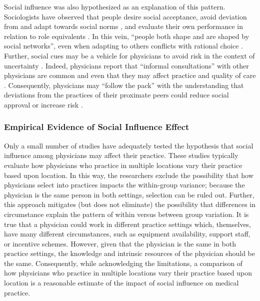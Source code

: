 \documentclass[12pt]{article}
\begin{document}
Social influence was also hypothesized as an explanation of this pattern. Sociologists have observed that people desire social acceptance, avoid deviation from and adapt towards social norms \citep{eddyVariationsPhysicianPractice1984,dambrunImpactHierarchyenhancingVs2002}, and evaluate their own performance in relation to role equivalents \citep{fehrFriendshipProcesses1996,ericksonRelationalBasisAttitudes1988}. In this vein, ``people both shape and are shaped by social networks'', even when adapting to others conflicts with rational choice \citep{pescosolidoRationalChoiceSocial1992}. Further, social cues may be a vehicle for physicians to avoid risk in the context of uncertainty \citep{banduraSocialFoundationsThought1986}. Indeed, physicians report that ``informal consultations'' with other physicians are common \citep{keatingPhysiciansExperiencesBeliefs1998} and even that they may affect practice and quality of care \citep{eisenbergPhysicianUtilizationState1985,keatingFactorsAffectingInfluential2007,geneauUnderstandingWorkGeneral2008}. Consequently, physicians may ``follow the pack'' with the understanding that deviations from the practices of their proximate peers could reduce social approval or increase risk \citep{westertMedicalPracticeVariations1999}.

\subsubsection{Empirical Evidence of Social Influence Effect}

Only a small number of studies have adequately tested the hypothesis that social influence among physicians may affect their practice. These studies typically evaluate how physicians who practice in multiple locations vary their practice based upon location. In this way, the researchers exclude the possibility that how physicians select into practices impacts the within-group variance; because the physician is the same person in both settings, selection can be ruled out. Further, this approach mitigates (but does not eliminate) the possibility that differences in circumstance explain the pattern of within versus between group variation. It is true that a physician could work in different practice settings which, themselves, have many different circumstances, such as equipment availability, support staff, or incentive schemes. However, given that the physician is the same in both practice settings, the knowledge and intrinsic resources of the physician should be the same. Consequently, while acknowledging the limitations, a comparison of how physicians who practice in multiple locations vary their practice based upon location is a reasonable estimate of the impact of social influence on medical practice.
\end{document}
